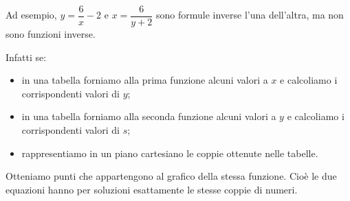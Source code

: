 % 
% 
% 



Ad esempio, \(y = \dfrac{6}{x} -2\) e \(x = \dfrac{6}{y +2}\) 
sono formule inverse l'una dell'altra, ma non sono funzioni inverse.

Infatti se:
\begin{itemize} [noitemsep]
\item in una tabella forniamo alla prima funzione alcuni valori 
a \(x\) e calcoliamo i corrispondenti valori di \(y\);
\item in una tabella forniamo alla seconda funzione alcuni valori 
a \(y\) e calcoliamo i corrispondenti valori di \(s\);
\item rappresentiamo in un piano cartesiano le coppie ottenute nelle 
tabelle.
\end{itemize}
Otteniamo punti che appartengono al grafico della stessa funzione. 
Cioè le due equazioni hanno per soluzioni esattamente le stesse coppie di 
numeri.


